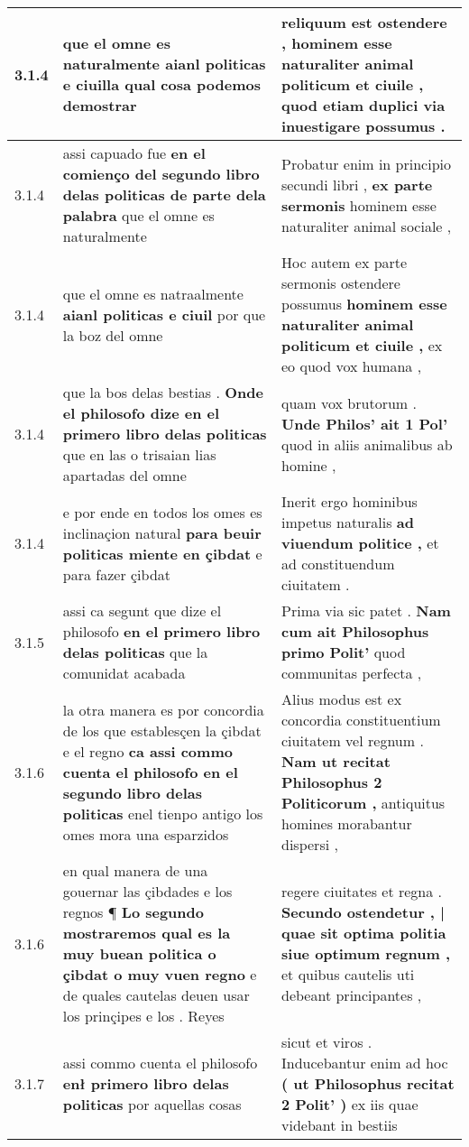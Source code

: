 \begin{tabular}{|p{1cm}|p{6.5cm}|p{6.5cm}|}
3.1.4 & que el omne es naturalmente \textbf{ aianl politicas } e ciuilla qual cosa podemos demostrar & reliquum est ostendere , \textbf{ hominem esse naturaliter animal politicum et ciuile , } quod etiam duplici via inuestigare possumus . \\\hline
3.1.4 & assi capuado fue \textbf{ en el comienço del segundo libro delas politicas de parte dela palabra } que el omne es naturalmente & Probatur enim in principio secundi libri , \textbf{ ex parte sermonis } hominem esse naturaliter animal sociale , \\\hline
3.1.4 & que el omne es natraalmente \textbf{ aianl politicas e ciuil } por que la boz del omne & Hoc autem ex parte sermonis ostendere possumus \textbf{ hominem esse naturaliter animal politicum et ciuile , } ex eo quod vox humana , \\\hline
3.1.4 & que la bos delas bestias . \textbf{ Onde el philosofo dize en el primero libro delas politicas } que en las o trisaian lias apartadas del omne & quam vox brutorum . \textbf{ Unde Philos’ ait 1 Pol’ } quod in aliis animalibus ab homine , \\\hline
3.1.4 & e por ende en todos los omes es inclinaçion natural \textbf{ para beuir politicas miente en çibdat } e para fazer çibdat & Inerit ergo hominibus impetus naturalis \textbf{ ad viuendum politice , } et ad constituendum ciuitatem . \\\hline
3.1.5 & assi ca segunt que dize el philosofo \textbf{ en el primero libro delas politicas } que la comunidat acabada & Prima via sic patet . \textbf{ Nam cum ait Philosophus primo Polit’ } quod communitas perfecta , \\\hline
3.1.6 & la otra manera es por concordia de los que establesçen la çibdat e el regno \textbf{ ca assi commo cuenta el philosofo en el segundo libro delas politicas } enel tienpo antigo los omes mora una esparzidos & Alius modus est ex concordia constituentium ciuitatem vel regnum . \textbf{ Nam ut recitat Philosophus 2 Politicorum , } antiquitus homines morabantur dispersi , \\\hline
3.1.6 & en qual manera de una gouernar las çibdades e los regnos ¶ \textbf{ Lo segundo mostraremos qual es la muy buean politica o çibdat o muy vuen regno } e de quales cautelas deuen usar los prinçipes e los . Reyes & regere ciuitates et regna . \textbf{ Secundo ostendetur , | quae sit optima politia siue optimum regnum , } et quibus cautelis uti debeant principantes , \\\hline
3.1.7 & assi commo cuenta el philosofo \textbf{ enł primero libro delas politicas } por aquellas cosas & sicut et viros . Inducebantur enim ad hoc \textbf{ ( ut Philosophus recitat 2 Polit’ ) } ex iis quae videbant in bestiis \\\hline

\end{tabular}
